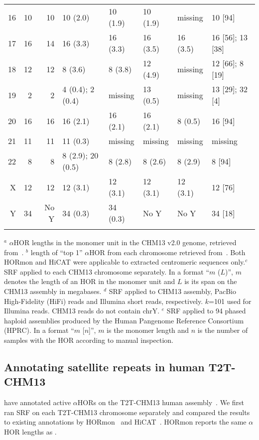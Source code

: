 \documentclass{bioinfo}
\begin{document}
\begin{table*}[!tb]
{\begin{tabular*}{\textwidth}{@{\extracolsep{\fill}}rrrlllll}
16 & 10 & 10 & 10 (2.0)          & 10 (1.9) & 10 (1.9) & missing  & 10 [94] \\
17 & 16 & 14 & 16 (3.3)          & 16 (3.3) & 16 (3.5) & 16 (3.5) & 16 [56]; 13 [38] \\
18 & 12 & 12 & 8 (3.6)           & 8 (3.8)  & 12 (4.9) & missing  & 12 [66]; 8 [19] \\
19 & 2  & 2  & 4 (0.4); 2 (0.4)  & missing  & 13 (0.5) & missing  & 13 [29]; 32 [4] \\
20 & 16 & 16 & 16 (2.1)          & 16 (2.1) & 16 (2.1) & 8 (0.5)  & 16 [94] \\
21 & 11 & 11 & 11 (0.3)          & missing  & missing  & missing  & missing \\
22 & 8  & 8  & 8 (2.9); 20 (0.5) & 8 (2.8)  & 8 (2.6)  & 8 (2.9)  & 8 [94] \\
X  & 12 & 12 & 12 (3.1)          & 12 (3.1) & 12 (3.1) & 12 (3.1) & 12 [76] \\
Y  & 34 &No Y& 34 (0.3)          & 34 (0.3) & No Y     & No Y     & 34 [18] \\
\botrule
\end{tabular*}
}{$^a$ $\alpha$HOR lengths in the monomer unit in the CHM13 v2.0 genome, retrieved
from~\citet{Kunyavskaya:2022tx}.  $^b$ length of ``top 1'' $\alpha$HOR from each
chromosome retrieved from~\citet{Gao2022.08.07.502881}. Both HORmon and HiCAT
were applicable to extracted centromeric sequences only.$^c$ SRF applied to
each CHM13 chromosome separately. In a format ``$m$ ($L$)'', $m$ denotes the
length of an HOR in the monomer unit and $L$ is its span on the CHM13 assembly
in megabases. $^d$ SRF applied to CHM13 assembly, PacBio High-Fidelity (HiFi) reads and
Illumina short reads, respectively. $k$=101 used for Illumina reads. CHM13
reads do not contain chrY. $^e$ SRF applied to 94 phased haploid assemblies
produced by the Human Pangenome Reference Consortium (HPRC).  In a format ``$m$
[$n$]'', $m$ is the monomer length and $n$ is the number of samples with the
HOR according to manual inspection.} 
\end{table*}

\subsection{Annotating satellite repeats in human T2T-CHM13}

\citet{Altemose:2022tv} have annotated active $\alpha$HORs on the T2T-CHM13
human assembly~\citep{Nurk:2022up}.  We first ran SRF on each T2T-CHM13
chromosome separately and compared the results to existing annotations by
HORmon~\citep{Kunyavskaya:2022tx} and HiCAT~\citep{Gao2022.08.07.502881}.
HORmon reports the same $\alpha$HOR lengths as \citet{Altemose:2022tv}.
\end{document}
